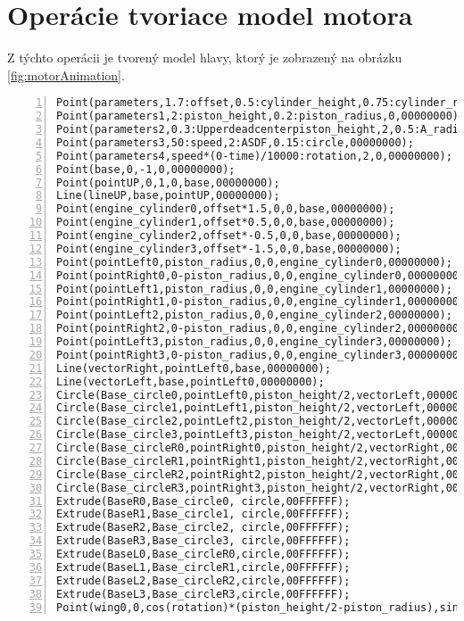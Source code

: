 \chapter{Operácie tvoriace model motora}
\label{priloha:motor}
Z týchto operácii je tvorený model hlavy, ktorý je zobrazený na obrázku \ref{fig:motorAnimation}.
\begin{lstlisting}[numbers=left]
Point(parameters,1.7:offset,0.5:cylinder_height,0.75:cylinder_radius,00000000);
Point(parameters1,2:piston_height,0.2:piston_radius,0,00000000);
Point(parameters2,0.3:Upperdeadcenterpiston_height,2,0.5:A_radius, 00000000);
Point(parameters3,50:speed,2:ASDF,0.15:circle,00000000);
Point(parameters4,speed*(0-time)/10000:rotation,2,0,00000000);
Point(base,0,-1,0,00000000);
Point(pointUP,0,1,0,base,00000000);
Line(lineUP,base,pointUP,00000000);
Point(engine_cylinder0,offset*1.5,0,0,base,00000000);
Point(engine_cylinder1,offset*0.5,0,0,base,00000000);
Point(engine_cylinder2,offset*-0.5,0,0,base,00000000);
Point(engine_cylinder3,offset*-1.5,0,0,base,00000000);
Point(pointLeft0,piston_radius,0,0,engine_cylinder0,00000000);
Point(pointRight0,0-piston_radius,0,0,engine_cylinder0,00000000);
Point(pointLeft1,piston_radius,0,0,engine_cylinder1,00000000);
Point(pointRight1,0-piston_radius,0,0,engine_cylinder1,00000000);
Point(pointLeft2,piston_radius,0,0,engine_cylinder2,00000000);
Point(pointRight2,0-piston_radius,0,0,engine_cylinder2,00000000);
Point(pointLeft3,piston_radius,0,0,engine_cylinder3,00000000);
Point(pointRight3,0-piston_radius,0,0,engine_cylinder3,00000000);
Line(vectorRight,pointLeft0,base,00000000);
Line(vectorLeft,base,pointLeft0,00000000);
Circle(Base_circle0,pointLeft0,piston_height/2,vectorLeft,00000000);
Circle(Base_circle1,pointLeft1,piston_height/2,vectorLeft,00000000);
Circle(Base_circle2,pointLeft2,piston_height/2,vectorLeft,00000000);
Circle(Base_circle3,pointLeft3,piston_height/2,vectorLeft,00000000);
Circle(Base_circleR0,pointRight0,piston_height/2,vectorRight,00000000);
Circle(Base_circleR1,pointRight1,piston_height/2,vectorRight,00000000);
Circle(Base_circleR2,pointRight2,piston_height/2,vectorRight,00000000);
Circle(Base_circleR3,pointRight3,piston_height/2,vectorRight,00000000);
Extrude(BaseR0,Base_circle0, circle,00FFFFFF);
Extrude(BaseR1,Base_circle1, circle,00FFFFFF);
Extrude(BaseR2,Base_circle2, circle,00FFFFFF);
Extrude(BaseR3,Base_circle3, circle,00FFFFFF);
Extrude(BaseL0,Base_circleR0,circle,00FFFFFF);
Extrude(BaseL1,Base_circleR1,circle,00FFFFFF);
Extrude(BaseL2,Base_circleR2,circle,00FFFFFF);
Extrude(BaseL3,Base_circleR3,circle,00FFFFFF);
Point(wing0,0,cos(rotation)*(piston_height/2-piston_radius),sin(rotation)*(piston_height/2-piston_radius),engine_cylinder0,000000FF);

\end{lstlisting}
